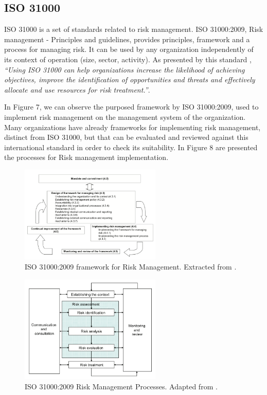 \subsection{ISO 31000}

ISO 31000 is a set of standards related to risk management. ISO 31000:2009, Risk management - Principles and guidelines, provides principles, framework and a process for managing risk. It can be used by any organization independently of its context of operation (size, sector, activity). As presented by this standard \cite{ISO31000}, \textit{``Using ISO 31000 can help organizations increase the likelihood of achieving objectives, improve the identification of opportunities and threats and effectively allocate and use resources for risk treatment.''}.\par
In Figure 7, we can observe the purposed framework by ISO 31000:2009, used to implement risk management on the management system of the organization. Many organizations have already frameworks for implementing risk management, distinct from ISO 31000, but that can be evaluated and reviewed against this international standard in order to check its suitability. In Figure 8 are presented the processes for Risk management implementation.\par

\begin{figure}[h!]
\centering
\includegraphics[width=0.6\textwidth]{img/ISO31000Framework.png}
\caption{ISO 31000:2009 framework for Risk Management. Extracted from \cite{ISO31000}.}
\end{figure}

\begin{figure}[h!]
\centering
\includegraphics[width=0.6\textwidth]{img/ISO31000RiskProcesses.png}
\caption{ISO 31000:2009 Risk Management Processes. Adapted from \cite{ISO31000}.}
\end{figure}

